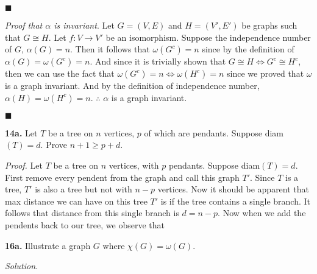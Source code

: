 \documentclass{article}
\begin{document}
\begin{flushright}
\(\blacksquare\)
\end{flushright}


\newpage

\textit{Proof that \(\alpha \) is invariant}. Let \(G= (V,E)\) and \(H=(V',E')\) be graphs such that \(G \cong H\). Let \(f:V\rightarrow V'\) be an isomorphism. Suppose the independence number of \(G\),   \( \alpha(G)=n\). Then it follows that \(\omega(G^c) = n \) since by the definition of \(\alpha(G) = \omega(G^c)=n \).  And since it is trivially shown that \( G \cong H \iff G^c \cong H^c \), then we can use the fact that \( \omega(G^c)=n \iff \omega(H^c) = n \) since we proved that \( \omega \) is a graph invariant. And by the definition of independence number, \( \alpha(H) =  \omega(H^c) = n \). \(\therefore\) \( \alpha \) is a graph invariant. 

\begin{flushright}
\(\blacksquare\)
\end{flushright}


\vspace{4mm}
\textbf{14a.} Let \(T\) be a tree on \(n\) vertices, \(p\) of which are pendants. Suppose  diam\((T)=d \). Prove \(n+1 \geq p+d\). 


\vspace{2mm}

\textit{Proof.} Let \(T\) be a tree on \(n\) vertices, with \(p\) pendants. Suppose diam\((T)=d\). First remove every pendent from the graph and call this graph \(T'\). Since \(T\) is a tree, \(T'\) is also a tree but not with \(n-p\) vertices. Now it should be apparent that max distance we can have on this tree \(T'\) is if the tree contains a single branch. It follows that distance from this single branch is \( d = n-p\). Now when we add the pendents back to our tree, we observe that


\vspace{4mm}

\textbf{16a.} Illustrate a graph \(G\) where \(\chi(G)=\omega(G)\). 


\vspace{2mm}

\textit{Solution.}
\begin{center}
\end{center}
\end{document}
